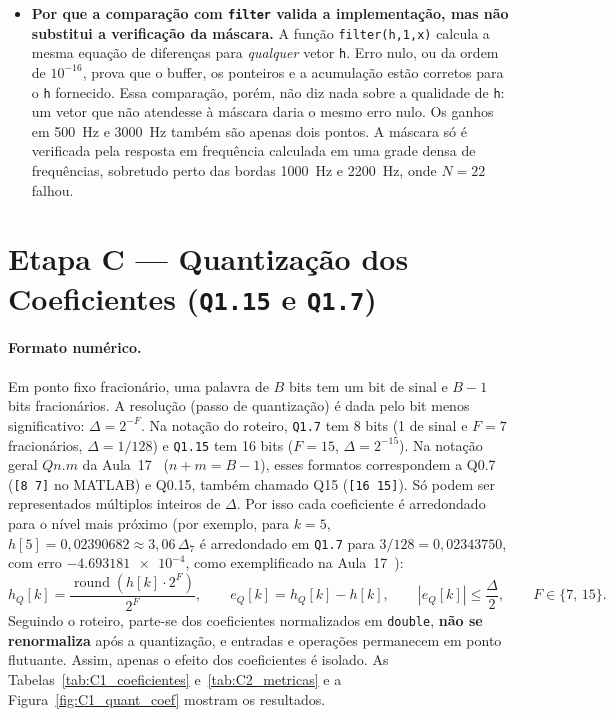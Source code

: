 \documentclass[11pt,a4paper]{article}
\begin{document}
\begin{itemize}[leftmargin=1.5em, itemsep=3pt]
    \item \textbf{Por que a comparação com \texttt{filter} valida a implementação, mas não substitui a verificação da máscara.} A função \texttt{filter(h,1,x)} calcula a mesma equação de diferenças para \emph{qualquer} vetor \texttt{h}. Erro nulo, ou da ordem de $10^{-16}$, prova que o buffer, os ponteiros e a acumulação estão corretos para o \texttt{h} fornecido. Essa comparação, porém, não diz nada sobre a qualidade de \texttt{h}: um vetor que não atendesse à máscara daria o mesmo erro nulo. Os ganhos em \SI{500}{Hz} e \SI{3000}{Hz} também são apenas dois pontos. A máscara só é verificada pela resposta em frequência calculada em uma grade densa de frequências, sobretudo perto das bordas \SI{1000}{Hz} e \SI{2200}{Hz}, onde $N = 22$ falhou.
\end{itemize}

\FloatBarrier
\section{Etapa C — Quantização dos Coeficientes (\texttt{Q1.15} e \texttt{Q1.7})}

\paragraph{Formato numérico.} Em ponto fixo fracionário, uma palavra de $B$ bits tem um bit de sinal e $B - 1$ bits fracionários. A resolução (passo de quantização) é dada pelo bit menos significativo: $\Delta = 2^{-F}$. Na notação do roteiro, \texttt{Q1.7} tem 8 bits (1 de sinal e $F = 7$ fracionários, $\Delta = 1/128$) e \texttt{Q1.15} tem 16 bits ($F = 15$, $\Delta = 2^{-15}$). Na notação geral $Q n.m$ da Aula~17~\cite{aula17} ($n + m = B - 1$), esses formatos correspondem a Q0.7 (\texttt{[8 7]} no MATLAB) e Q0.15, também chamado Q15 (\texttt{[16 15]}). Só podem ser representados múltiplos inteiros de $\Delta$. Por isso cada coeficiente é arredondado para o nível mais próximo (por exemplo, para $k = 5$, $h[5] = 0,02390682 \approx 3,06\,\Delta_7$ é arredondado em \texttt{Q1.7} para $3/128 = 0,02343750$, com erro $\num{-4,693181e-4}$, como exemplificado na Aula~17~\cite{aula17}):
\begin{equation}
    h_Q[k] = \frac{\operatorname{round}\!\left(h[k]\cdot 2^F\right)}{2^F}, \qquad e_Q[k] = h_Q[k] - h[k], \qquad |e_Q[k]| \le \frac{\Delta}{2}, \qquad F \in \{7,\, 15\}.
\end{equation}
Seguindo o roteiro, parte-se dos coeficientes normalizados em \texttt{double}, \textbf{não se renormaliza} após a quantização, e entradas e operações permanecem em ponto flutuante. Assim, apenas o efeito dos coeficientes é isolado. As Tabelas~\ref{tab:C1_coeficientes} e~\ref{tab:C2_metricas} e a Figura~\ref{fig:C1_quant_coef} mostram os resultados.
\end{document}
